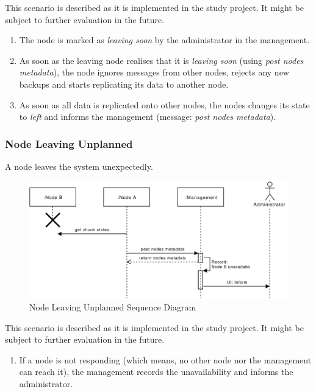 This scenario is described as it is implemented in the study project. It might be subject to further evaluation in the future.

\begin{enumerate}
    \item The node is marked as \emph{leaving soon} by the administrator in the management.
    \item As soon as the leaving node realises that it is \emph{leaving soon} (using \emph{post nodes metadata}), the node ignores messages from other nodes, rejects any new backups and starts replicating its data to another node.
    \item As soon as all data is replicated onto other nodes, the nodes changes its state to \emph{left} and informs the management (message: \emph{post nodes metadata}).
\end{enumerate}

\subsubsection{Node Leaving Unplanned}\label{sec:scenario-node-leave-unplanned}
A node leaves the system unexpectedly.

\begin{figure}[h]
    \centering
    \includegraphics[width=\linewidth]{resources/node_leaving_unplanned.pdf}
    \caption{Node Leaving Unplanned Sequence Diagram}
    \label{fig:node-leave-unplanned}
\end{figure}

This scenario is described as it is implemented in the study project. It might be subject to further evaluation in the future.

\begin{enumerate}
    \item If a node is not responding (which means, no other node nor the management can reach it), the management records the unavailability and informs the administrator.
\end{enumerate}

